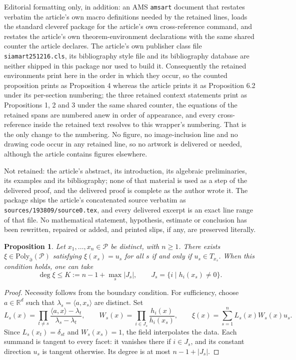 \documentclass[10pt,a4paper]{amsart}
\theoremstyle{plain}
\newtheorem{proposition}[theorem]{Proposition}
\theoremstyle{definition}
\theoremstyle{remark}
\newcommand{\Pt}[1]{{\mathrm{Poly_{\partial}}({#1})}}
\newcommand{\mP}{\mathcal{P}}
\newcommand{\R}{\mathbb{R}}
\begin{document}
Editorial formatting only, in addition: an AMS \texttt{amsart} document that restates verbatim the article's own macro definitions needed by the retained lines, loads the standard cleveref package for the article's own cross-reference command, and restates the article's own theorem-environment declarations with the same shared counter the article declares. The article's own publisher class file \texttt{siamart251216.cls}, its bibliography style file and its bibliography database are neither shipped in this package nor used to build it. Consequently the retained environments print here in the order in which they occur, so the counted proposition prints as Proposition 4 whereas the article prints it as Proposition 6.2 under its per-section numbering; the three retained context statements print as Propositions 1, 2 and 3 under the same shared counter, the equations of the retained spans are numbered anew in order of appearance, and every cross-reference inside the retained text resolves to this wrapper's numbering. That is the only change to the numbering. No figure, no image-inclusion line and no drawing code occur in any retained line, so no artwork is delivered or needed, although the article contains figures elsewhere.

Not retained: the article's abstract, its introduction, its algebraic preliminaries, its examples and its bibliography; none of that material is used as a step of the delivered proof, and the delivered proof is complete as the author wrote it. The package ships the article's concatenated source verbatim as \texttt{sources/193809/source0.tex}, and every delivered excerpt is an exact line range of that file. No mathematical statement, hypothesis, estimate or conclusion has been rewritten, repaired or added, and printed slips, if any, are preserved literally.
\begin{proposition}\label{prop:interpolation_possible}
Let $x_1,\ldots,x_n\in\mP$ be distinct, with $n\ge1$. There exists $\xi\in\Pt{\mP}$ satisfying $\xi(x_s)=u_s$ for all $s$ if and only if $u_s\in T_{x_s}$. When this condition holds, one can take
\begin{equation}\label{eq:degree-bound}
\deg\xi\le K:=n-1+\max_s|J_s|,
\qquad J_s=\{i \mid h_i(x_s)\ne0\}.
\end{equation}
\end{proposition}

\begin{proof}
Necessity follows from the boundary condition. For sufficiency, choose $a\in\R^d$ such that $\lambda_s=\langle a,x_s\rangle$ are distinct. Set
\[
L_s(x)=\prod_{t\ne s}
\frac{\langle a,x\rangle-\lambda_t}{\lambda_s-\lambda_t},\qquad
W_s(x)=\prod_{i\in J_s}\frac{h_i(x)}{h_i(x_s)},\qquad
\xi(x)=\sum_{s=1}^n L_s(x)W_s(x)u_s.
\]
Since $L_s(x_t)=\delta_{st}$ and $W_s(x_s)=1$, the field interpolates the data. Each summand is tangent to every facet: it vanishes there if $i\in J_s$, and its constant direction $u_s$ is tangent otherwise. Its degree is at most $n-1+|J_s|$.
\end{proof}
\end{document}
